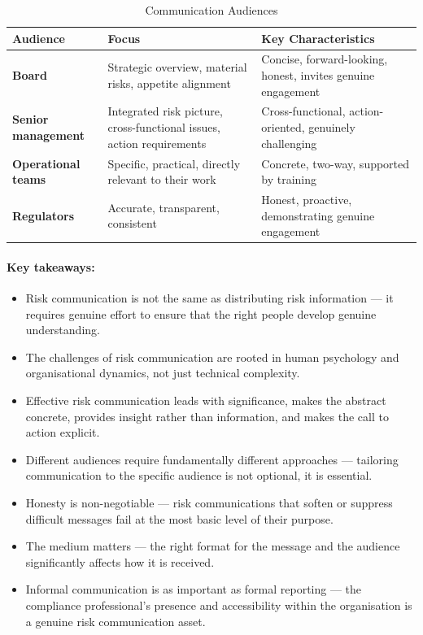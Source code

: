 \begin{table}[H]
  \centering
  \renewcommand{\arraystretch}{1.5}
  \begin{tabularx}{\textwidth}{ | >{\raggedright\arraybackslash}p{} 
								| >{\raggedright\arraybackslash}p{} 
                                | >{\raggedright\arraybackslash}X | }
    \hline
    \textbf{Audience} & \textbf{Focus} & \textbf{Key Characteristics} \\
    \hline
    \textbf{Board} & Strategic overview, material risks, appetite alignment & Concise, forward-looking, honest, invites genuine engagement\\
    \hline
    \textbf{Senior management} & Integrated risk picture, cross-functional issues, action requirements & Cross-functional, action-oriented, genuinely challenging\\
    \hline
    \textbf{Operational teams} & Specific, practical, directly relevant to their work & Concrete, two-way, supported by training\\
    \hline
    \textbf{Regulators} & Accurate, transparent, consistent & Honest, proactive, demonstrating genuine engagement\\
    \hline
  \end{tabularx}
  \caption{Communication Audiences}
\end{table}

\paragraph{Key takeaways:}
\begin{itemize}
  \item{Risk communication is not the same as distributing risk information — it requires genuine effort to ensure that the right people develop genuine understanding.}
  \item{The challenges of risk communication are rooted in human psychology and organisational dynamics, not just technical complexity.}
  \item{Effective risk communication leads with significance, makes the abstract concrete, provides insight rather than information, and makes the call to action explicit.}
  \item{Different audiences require fundamentally different approaches — tailoring communication to the specific audience is not optional, it is essential.}
  \item{Honesty is non-negotiable — risk communications that soften or suppress difficult messages fail at the most basic level of their purpose.}
  \item{The medium matters — the right format for the message and the audience significantly affects how it is received.}
  \item{Informal communication is as important as formal reporting — the compliance professional's presence and accessibility within the organisation is a genuine risk communication asset.}
\end{itemize}

